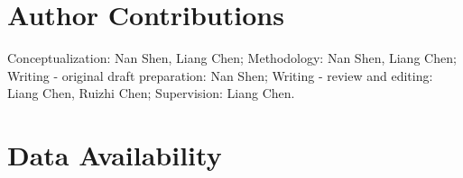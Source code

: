 \documentclass{svjour3}                     %
\begin{document}
\section*{Author Contributions}
Conceptualization: Nan Shen, Liang Chen; Methodology: Nan Shen, Liang Chen; Writing - original draft preparation: Nan Shen; Writing - review and editing: Liang Chen, Ruizhi Chen; Supervision: Liang Chen.
 \section*{Data Availability}



\end{document}
